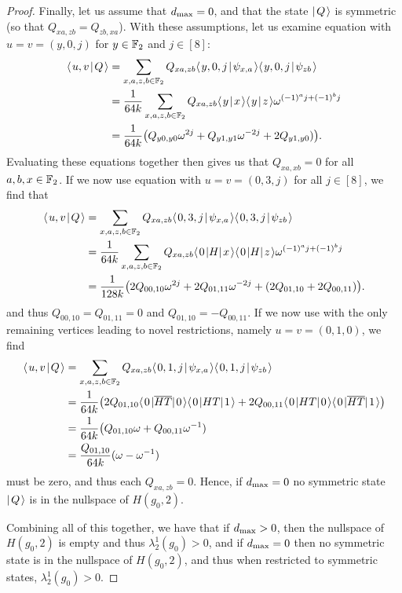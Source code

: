 \documentclass[../thesis-main/thesis-main]{subfiles}
\begin{document}
\begin{proof}
Finally, let us assume that $\dmax = 0$, and that the state $\ket{Q}$ is symmetric (so that $Q_{xa,zb} = Q_{zb,xa}$).  With these assumptions, let us examine equation  with $u=v = (y,0,j)$ for $y\in \FF_2$ and $j\in [8]$:
\begin{align}
  \braket{u,v}{Q} &= \sum_{x,a,z,b\in \FF_2} Q_{xa,zb} \braket{y,0,j}{\psi_{x,a}}\braket{y,0,j}{\psi_{zb}}\\
  &=\frac{1}{64 k} \sum_{x,a,z,b\in \FF_2} Q_{xa,zb} \braket{y}{x} \braket{y}{z} \omega^{(-1)^a j+ (-1)^b j}\\
  &= \frac{1}{64 k} \big(Q_{y0,y0}  \omega^{2j} + Q_{y1,y1} \omega^{-2j}+2 Q_{y1,y0} )\big).
\end{align}
Evaluating these equations together then gives us that $Q_{xa,xb} = 0$ for all $a,b,x \in \FF_2$.  If we now use equation  with $u=v=(0,3,j)$ for all $j\in [8]$, we find that
\begin{align}
  \braket{u,v}{Q} &= \sum_{x,a,z,b\in \FF_2} Q_{xa,zb} \braket{0,3,j}{\psi_{x,a}}\braket{0,3,j}{\psi_{zb}}\\
  &=\frac{1}{64 k} \sum_{x,a,z,b\in \FF_2} Q_{xa,zb} \bra{0}H \ket{x} \bra{0}H\ket{z} \omega^{(-1)^a j+ (-1)^b j}\\
  &= \frac{1}{128 k} \big(2 Q_{00,10}  \omega^{2j} + 2 Q_{01,11} \omega^{-2j}+(2 Q_{01,10} + 2 Q_{00,11} )\big).
\end{align}
and thus $Q_{00,10} = Q_{01,11} = 0$ and $Q_{01,10} = - Q_{00,11}$.  If we now use  with the only remaining vertices leading to novel restrictions, namely $u = v = (0,1,0)$, we find 
\begin{align}
  \braket{u,v}{Q} &= \sum_{x,a,z,b\in \FF_2} Q_{xa,zb} \braket{0,1,j}{\psi_{x,a}}\braket{0,1,j}{\psi_{zb}}\\
  &=\frac{1}{64 k} \big( 2 Q_{01,10}\bra{0} \overline{HT} \ket{0} \bra{0} HT \ket{1}  + 2 Q_{00,11} \bra{0}HT \ket{0} \bra{0} \overline{HT} \ket{1}\big)\\
  &= \frac{1}{64 k} \big( Q_{01,10} \omega + Q_{00,11} \omega^{-1})\\
  &= \frac{Q_{01,10}}{ 64 k} ( \omega - \omega^{-1})
\end{align}
must be zero, and thus each $Q_{xa,zb} = 0$.  Hence, if $\dmax = 0$ no symmetric state $\ket{Q}$ is in the nullspace of $H(g_0,2)$.  

Combining all of this together, we have that if $\dmax > 0$, then the nullspace of $H(g_0,2)$ is empty and thus $\lambda_2^1(g_0) > 0$, and if $\dmax = 0$ then no symmetric state is in the nullspace of $H(g_0,2)$, and thus when restricted to symmetric states, $\lambda_2^1(g_0) > 0$.
\end{proof}
\end{document}
